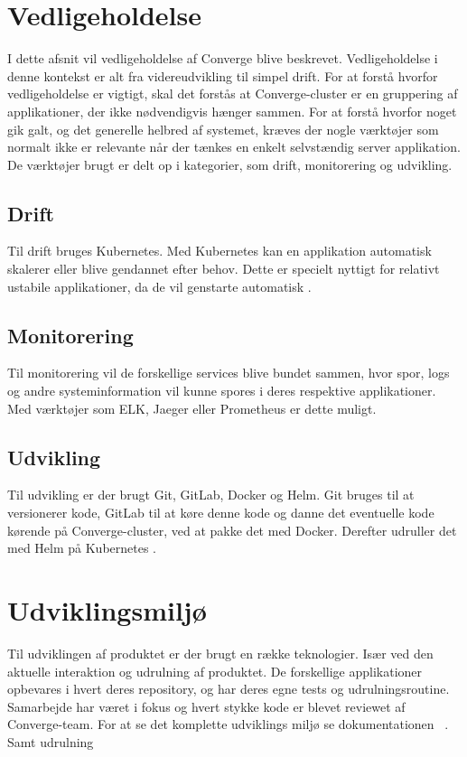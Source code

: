 \chapter{Vedligeholdelse}

I dette afsnit vil vedligeholdelse af Converge blive beskrevet. Vedligeholdelse i denne kontekst er alt fra videreudvikling til simpel drift. For at forstå hvorfor vedligeholdelse er vigtigt, skal det forstås at Converge-cluster er en gruppering af applikationer, der ikke nødvendigvis hænger sammen. For at forstå hvorfor noget gik galt, og det generelle helbred af systemet, kræves der nogle værktøjer som normalt ikke er relevante når der tænkes en enkelt selvstændig server applikation.
De værktøjer brugt er delt op i kategorier, som drift, monitorering og udvikling. 

\section{Drift}
Til drift bruges Kubernetes. Med Kubernetes kan en applikation automatisk skalerer eller blive gendannet efter behov. Dette er specielt nyttigt for relativt ustabile applikationer, da de vil genstarte automatisk \cite{deployment}. 

\section{Monitorering}
Til monitorering vil de forskellige services blive bundet sammen, hvor spor, logs og andre systeminformation vil kunne spores i deres respektive applikationer. Med værktøjer som ELK, Jaeger eller Prometheus er dette muligt. 

\section{Udvikling}
Til udvikling er der brugt Git, GitLab, Docker og Helm. Git bruges til at versionerer kode, GitLab til at køre denne kode og danne det eventuelle kode kørende på Converge-cluster, ved at pakke det med Docker. Derefter udruller det med Helm på Kubernetes \cite{development-environment}.

\chapter{Udviklingsmiljø}
\label{cha:development-environment}

Til udviklingen af produktet er der brugt en række teknologier. Især ved den aktuelle interaktion og udrulning af produktet. De forskellige applikationer opbevares i hvert deres repository, og har deres egne tests og udrulningsroutine. Samarbejde har været i fokus og hvert stykke kode er blevet reviewet af Converge-team. For at se det komplette udviklings miljø se dokumentationen ~\cite{application-development-dokumentation}. Samt udrulning ~\cite{deployment}

